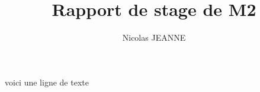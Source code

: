 \documentclass[12pt,a4paper]{report}
\author{Nicolas JEANNE}
\title{Rapport de stage de M2}
\begin{document}
voici une ligne de texte \cite{Anders2012}



\end{document}
